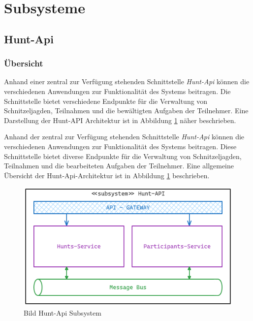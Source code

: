 \section{Subsysteme}

\subsection{Hunt-Api}

\subsubsection{Übersicht}

Anhand einer zentral zur Verfügung stehenden Schnittstelle \textit{Hunt-Api} können die verschiedenen Anwendungen zur Funktionalität des Systems beitragen. Die Schnittstelle bietet verschiedene Endpunkte für die Verwaltung von Schnitzeljagden, Teilnahmen und die bewältigten Aufgaben der Teilnehmer. Eine Darstellung der Hunt-API Architektur ist in Abbildung \ref{fig:swentwurf:huntapi:subsystem} näher beschrieben.

Anhand der zentral zur Verfügung stehenden Schnittstelle \textit{Hunt-Api} können die verschiedenen Anwendungen zur Funktionalität des Systems beitragen. Diese Schnittstelle bietet diverse Endpunkte für die Verwaltung von Schnitzeljagden, Teilnahmen und die bearbeiteten Aufgaben der Teilnehmer. Eine allgemeine Übersicht der Hunt-Api-Architektur ist in Abbildung \ref{fig:swentwurf:huntapi:subsystem} beschrieben.

\begin{figure}[H]
    \centering
    \includegraphics[width=\textwidth]{images/PrAr-Software-Entwurf-Hunt-Api-Subsystem.png}
    \caption{Bild Hunt-Api Subsystem}
    \label{fig:swentwurf:huntapi:subsystem}
\end{figure}

